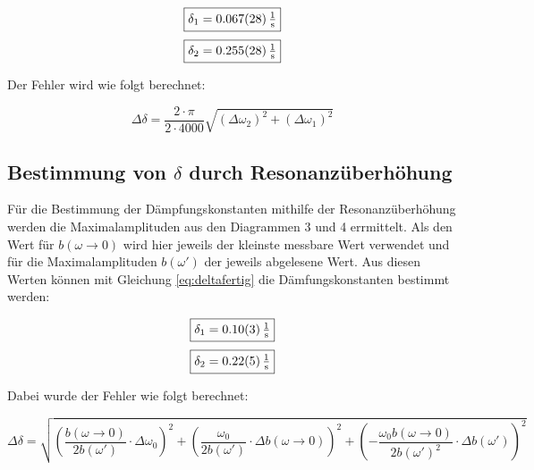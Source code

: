\[\boxed{\delta_1 = \SI{0,067 \pm 0,028}{\tfrac{1}{\second}}}\]
\[\boxed{\delta_2 = \SI{0,255 \pm 0,028}{\tfrac{1}{\second}}}\]

Der Fehler wird wie folgt berechnet:

\begin{equation}
    \Delta \delta = \frac{2 \cdot \pi}{2 \cdot 4000}\sqrt{(\Delta\omega_2)^2+ (\Delta\omega_1)^2}
\end{equation}

\subsection{Bestimmung von $\delta$ durch Resonanzüberhöhung}

Für die Bestimmung der Dämpfungskonstanten mithilfe der Resonanzüberhöhung werden die Maximalamplituden aus den Diagrammen 3 und 4 errmittelt.
Als den Wert für $b(\omega \rightarrow 0)$ wird hier jeweils der kleinste messbare Wert verwendet und für die Maximalamplituden $b(\omega')$ der jeweils abgelesene Wert.
Aus diesen Werten können mit Gleichung \ref{eq:deltafertig} die Dämfungskonstanten bestimmt werden:

\[\boxed{\delta_1 = \SI{0,10 \pm 0,03}{\tfrac{1}{\second}}}\]
\[\boxed{\delta_2 = \SI{0,22 \pm 0,05}{\tfrac{1}{\second}}}\]

Dabei wurde der Fehler wie folgt berechnet:

\begin{equation}
    \Delta \delta = \sqrt{
\left( \frac{b(\omega \to 0)}{2 b(\omega')} \cdot \Delta \omega_0 \right)^2
+ \left( \frac{\omega_0}{2 b(\omega')} \cdot \Delta b(\omega \to 0) \right)^2
+ \left( - \frac{\omega_0 b(\omega \to 0)}{2 b(\omega')^2} \cdot \Delta b(\omega') \right)^2
}
\end{equation}
